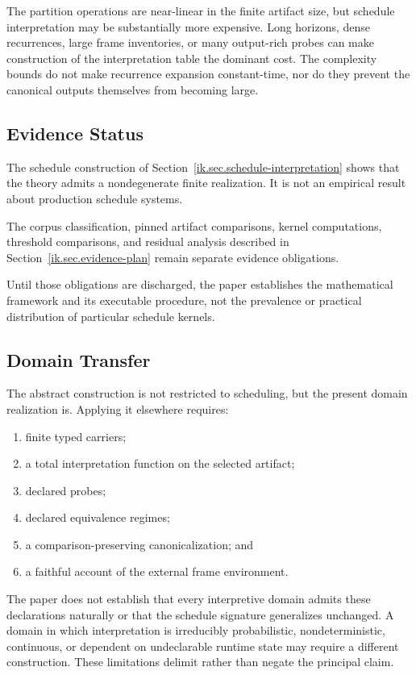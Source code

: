 \documentclass[11pt]{article}
\theoremstyle{plain}
\theoremstyle{definition}
\theoremstyle{remark}
\begin{document}
The partition operations are near-linear
in the finite artifact size, but schedule interpretation
may be substantially more expensive.
Long horizons, dense recurrences,
large frame inventories,
or many output-rich probes
can make construction
of the interpretation table
the dominant cost.
The complexity bounds do not make recurrence expansion
constant-time, nor do they prevent the canonical outputs themselves
from becoming large.

\subsection{Evidence Status}

The schedule construction of Section~\ref{ik.sec.schedule-interpretation}
shows that the theory admits a nondegenerate finite realization.
It is not an empirical result about production schedule systems.

The corpus classification,
pinned artifact comparisons,
kernel computations,
threshold comparisons,
and residual analysis
described in
Section~\ref{ik.sec.evidence-plan}
remain separate evidence obligations.

Until those obligations are discharged,
the paper establishes
the mathematical framework
and its executable procedure,
not the prevalence
or practical distribution
of particular schedule kernels.

\subsection{Domain Transfer}

The abstract construction is not restricted to scheduling,
but the present domain realization is.
Applying it elsewhere requires:

\begin{enumerate}
  \item finite typed carriers;
  \item a total interpretation function on the selected artifact;
  \item declared probes;
  \item declared equivalence regimes;
  \item a comparison-preserving canonicalization; and
  \item a faithful account of the external frame environment.
\end{enumerate}

The paper does not establish that every interpretive domain
admits these declarations naturally or that the schedule signature
generalizes unchanged.
A domain in which interpretation is irreducibly probabilistic,
nondeterministic, continuous, or dependent on undeclarable runtime state
may require a different construction.
These limitations delimit rather than negate the principal claim.
\end{document}
